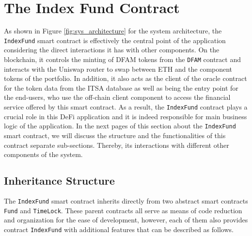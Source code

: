 \section{The Index Fund Contract} \label{sec:indexfundcontract}

As shown in Figure \ref{fig:sys_architecture} for the system architecture, the \texttt{IndexFund} smart contract is effectively the central point of the application considering the direct interactions it has with other components. On the blockchain, it controls the minting of DFAM tokens from the \texttt{DFAM} contract and interacts with the Uniswap router to swap between ETH and the component tokens of the portfolio. In addition, it also acts as the client of the oracle contract for the token data from the ITSA database as well as being the entry point for the end-users, who use the off-chain client component to access the financial service offered by this smart contract. As a result, the \texttt{IndexFund} contract plays a crucial role in this DeFi application and it is indeed responsible for main business logic of the application. 
In the next pages of this section about the \texttt{IndexFund} smart contract, we will discuss the structure and the functionalities of this contract separate sub-sections. Thereby, its interactions with different other components of the system.

\subsection{Inheritance Structure}

The \texttt{IndexFund} smart contract inherits directly from two abstract smart contracts \texttt{Fund} and \texttt{TimeLock}. These parent contracts all serve as means of code reduction and organization for the ease of development, however, each of them also provides contract \texttt{IndexFund} with additional features that can be described as follows.

